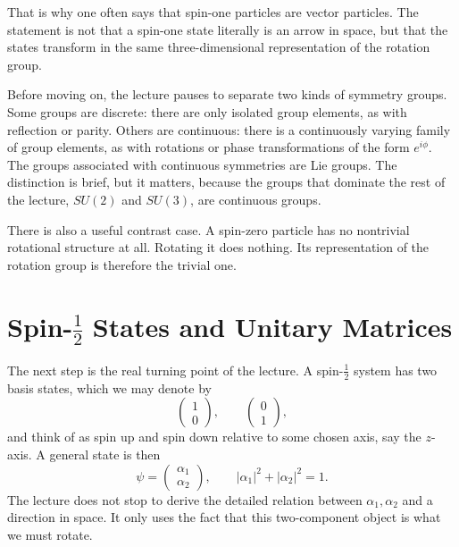 That is why one often says that spin-one particles are vector particles. The statement is not that a spin-one state literally is an arrow in space, but that the states transform in the same three-dimensional representation of the rotation group.

Before moving on, the lecture pauses to separate two kinds of symmetry groups. Some groups are discrete: there are only isolated group elements, as with reflection or parity. Others are continuous: there is a continuously varying family of group elements, as with rotations or phase transformations of the form \(e^{i\phi}\). The groups associated with continuous symmetries are Lie groups. The distinction is brief, but it matters, because the groups that dominate the rest of the lecture, \(SU(2)\) and \(SU(3)\), are continuous groups.

There is also a useful contrast case. A spin-zero particle has no nontrivial rotational structure at all. Rotating it does nothing. Its representation of the rotation group is therefore the trivial one.

\section{Spin-\texorpdfstring{\(\frac12\)}{1/2} States and Unitary Matrices}

The next step is the real turning point of the lecture. A spin-\(\frac12\) system has two basis states, which we may denote by
\begin{equation}
\begin{pmatrix}1\\0\end{pmatrix},
\qquad
\begin{pmatrix}0\\1\end{pmatrix},
\end{equation}
and think of as spin up and spin down relative to some chosen axis, say the \(z\)-axis. A general state is then
\begin{equation}
\psi=
\begin{pmatrix}
\alpha_1\\
\alpha_2
\end{pmatrix},
\qquad
|\alpha_1|^2+|\alpha_2|^2=1.
\end{equation}
The lecture does not stop to derive the detailed relation between \(\alpha_1,\alpha_2\) and a direction in space. It only uses the fact that this two-component object is what we must rotate.

